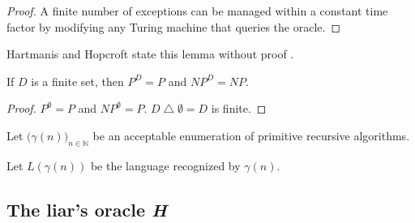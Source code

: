 \documentclass[letterpaper]{article}
\begin{document}
\begin{proof}
	A finite number of exceptions can be managed within a constant time factor by modifying any Turing machine that queries the oracle.
\end{proof}
\begin{remark}
	Hartmanis and Hopcroft state this lemma without proof \cite[\S 2, pp.~5--7]{tr-76-296}.
\end{remark}
\begin{corollary}
	If $D$ is a finite set, then $P^D=P$ and $NP^D=NP$.
\end{corollary}
\begin{proof}
	$P^\emptyset=P$ and $NP^\emptyset=P$.  $D\operatorname\triangle\emptyset=D$ is finite.
\end{proof}
\begin{construction}\label{defgamma}
	Let $\big(\gamma(n)\big)_{n\in\mathbb N}$ be an acceptable enumeration of primitive recursive algorithms.
\end{construction}
\begin{construction}\label{defL}
	Let $L(\gamma(n))$ be the language recognized by $\gamma(n)$.
\end{construction}
\subsection{The liar's oracle \textit{H}}\label{h}
\end{document}
